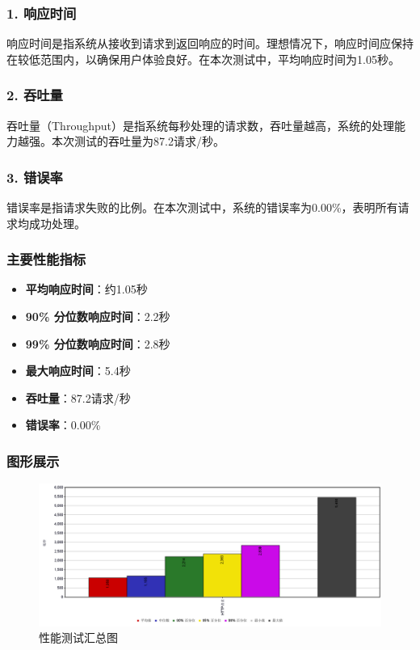 \documentclass{article}
\begin{document}
\subsubsection*{1. 响应时间}
响应时间是指系统从接收到请求到返回响应的时间。理想情况下，响应时间应保持在较低范围内，以确保用户体验良好。在本次测试中，平均响应时间为1.05秒。

\subsubsection* {2. 吞吐量}
吞吐量（Throughput）是指系统每秒处理的请求数，吞吐量越高，系统的处理能力越强。本次测试的吞吐量为87.2请求/秒。

\subsubsection* {3. 错误率}
错误率是指请求失败的比例。在本次测试中，系统的错误率为0.00\%，表明所有请求均成功处理。

\subsubsection*{主要性能指标}
\begin{itemize}
    \item \textbf{平均响应时间}：约1.05秒
    \item \textbf{90\% 分位数响应时间}：2.2秒
    \item \textbf{99\% 分位数响应时间}：2.8秒
    \item \textbf{最大响应时间}：5.4秒
    \item \textbf{吞吐量}：87.2请求/秒
    \item \textbf{错误率}：0.00\%
\end{itemize}

\subsubsection*{图形展示}
\begin{figure}[H]
    \centering
    \includegraphics[width=1\textwidth]{result_image.png}
    \caption{性能测试汇总图}
\end{figure}
\end{document}
